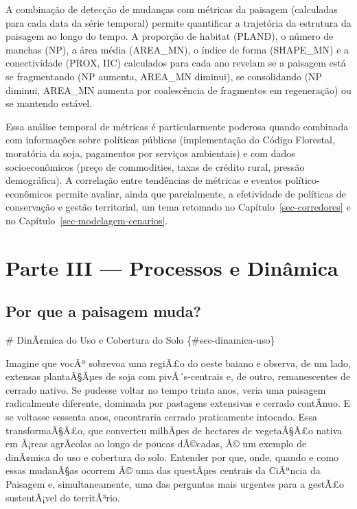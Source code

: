 \documentclass[
  portuguese,
  11pt,
  a4paper,
  open=any]{scrbook}
\begin{document}
A combinação de detecção de mudanças com métricas da paisagem
(calculadas para cada data da série temporal) permite quantificar a
trajetória da estrutura da paisagem ao longo do tempo. A proporção de
habitat (PLAND), o número de manchas (NP), a área média (AREA\_MN), o
índice de forma (SHAPE\_MN) e a conectividade (PROX, IIC) calculados
para cada ano revelam se a paisagem está se fragmentando (NP aumenta,
AREA\_MN diminui), se consolidando (NP diminui, AREA\_MN aumenta por
coalescência de fragmentos em regeneração) ou se mantendo estável.

Essa análise temporal de métricas é particularmente poderosa quando
combinada com informações sobre políticas públicas (implementação do
Código Florestal, moratória da soja, pagamentos por serviços ambientais)
e com dados socioeconômicos (preço de commodities, taxas de crédito
rural, pressão demográfica). A correlação entre tendências de métricas e
eventos político-econômicos permite avaliar, ainda que parcialmente, a
efetividade de políticas de conservação e gestão territorial, um tema
retomado no Capítulo~\ref{sec-corredores} e no
Capítulo~\ref{sec-modelagem-cenarios}.

\part{Parte III --- Processos e Dinâmica}

\chapter{Por que a paisagem muda?}\label{por-que-a-paisagem-muda}

\# DinÃ¢mica do Uso e Cobertura do Solo \{\#sec-dinamica-uso\}

Imagine que vocÃª sobrevoa uma regiÃ£o do oeste baiano e observa, de um
lado, extensas plantaÃ§Ãµes de soja com pivÃ´s-centrais e, de outro,
remanescentes de cerrado nativo. Se pudesse voltar no tempo trinta anos,
veria uma paisagem radicalmente diferente, dominada por pastagens
extensivas e cerrado contÃ­nuo. E se voltasse sessenta anos, encontraria
cerrado praticamente intocado. Essa transformaÃ§Ã£o, que converteu
milhÃµes de hectares de vegetaÃ§Ã£o nativa em Ã¡reas agrÃ­colas ao longo
de poucas dÃ©cadas, Ã© um exemplo de dinÃ¢mica do uso e cobertura do
solo. Entender por que, onde, quando e como essas mudanÃ§as ocorrem Ã©
uma das questÃµes centrais da CiÃªncia da Paisagem e, simultaneamente,
uma das perguntas mais urgentes para a gestÃ£o sustentÃ¡vel do
territÃ³rio.
\end{document}
